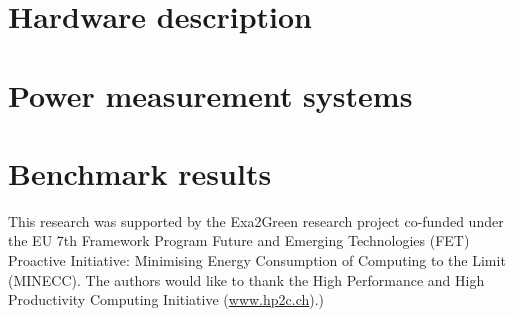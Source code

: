\documentclass[twocolumn]{svjour3}           %
\DeclareRobustCommand\IPCClongname{}
\begin{document}
\section{Hardware description}
\label{sec:2}

\section{Power measurement systems}
\label{sec:3}

\section{Benchmark results}
\label{sec:4}




\begin{acknowledgements}
This  research  was  supported   by  the  Exa2Green  research  project
co-funded  under the  EU  7th Framework  Program  Future and  Emerging
Technologies (FET) Proactive Initiative: Minimising Energy Consumption
of Computing to  the Limit (MINECC).  The authors  would like to thank
the  High  Performance  and  High  Productivity  Computing  Initiative
(\url{www.hp2c.ch}).)
\end{acknowledgements}

\DeclareRobustCommand\IPCClongname{ - Intergovernmental Panel on Climate Change}



\end{document}
